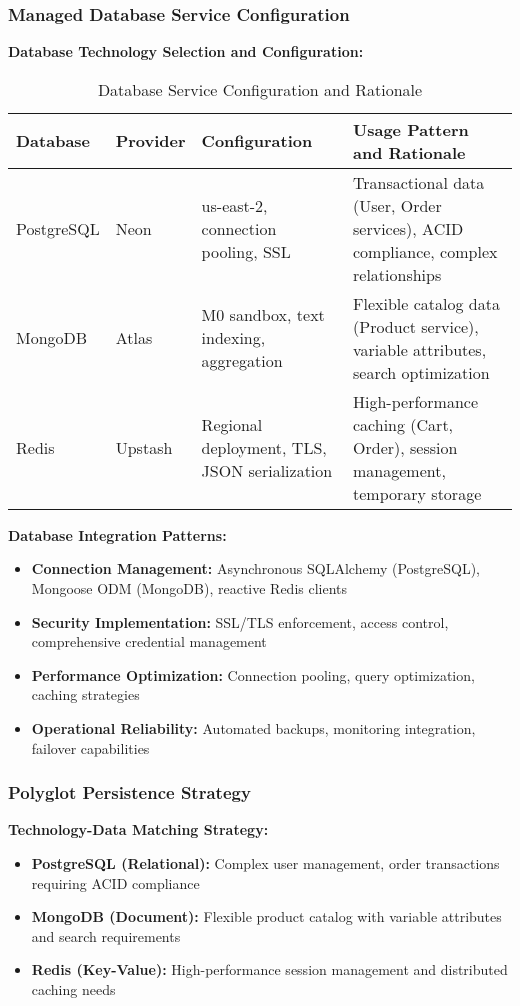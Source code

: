 \subsubsection{Managed Database Service Configuration}

\textbf{Database Technology Selection and Configuration:}

\begin{table}[H]
\centering
\caption{Database Service Configuration and Rationale}
\label{tab:database-configuration}
\begin{tabular}{|p{2.5cm}|p{2.5cm}|p{3cm}|p{5cm}|}
\hline
\textbf{Database} & \textbf{Provider} & \textbf{Configuration} & \textbf{Usage Pattern and Rationale} \\
\hline
PostgreSQL & Neon & us-east-2, connection pooling, SSL & Transactional data (User, Order services), ACID compliance, complex relationships \\
\hline
MongoDB & Atlas & M0 sandbox, text indexing, aggregation & Flexible catalog data (Product service), variable attributes, search optimization \\
\hline
Redis & Upstash & Regional deployment, TLS, JSON serialization & High-performance caching (Cart, Order), session management, temporary storage \\
\hline
\end{tabular}
\end{table}

\textbf{Database Integration Patterns:}
\begin{itemize}
\item \textbf{Connection Management:} Asynchronous SQLAlchemy (PostgreSQL), Mongoose ODM (MongoDB), reactive Redis clients
\item \textbf{Security Implementation:} SSL/TLS enforcement, access control, comprehensive credential management
\item \textbf{Performance Optimization:} Connection pooling, query optimization, caching strategies
\item \textbf{Operational Reliability:} Automated backups, monitoring integration, failover capabilities
\end{itemize}

\subsubsection{Polyglot Persistence Strategy}

\textbf{Technology-Data Matching Strategy:}
\begin{itemize}
\item \textbf{PostgreSQL (Relational):} Complex user management, order transactions requiring ACID compliance
\item \textbf{MongoDB (Document):} Flexible product catalog with variable attributes and search requirements
\item \textbf{Redis (Key-Value):} High-performance session management and distributed caching needs
\end{itemize}

